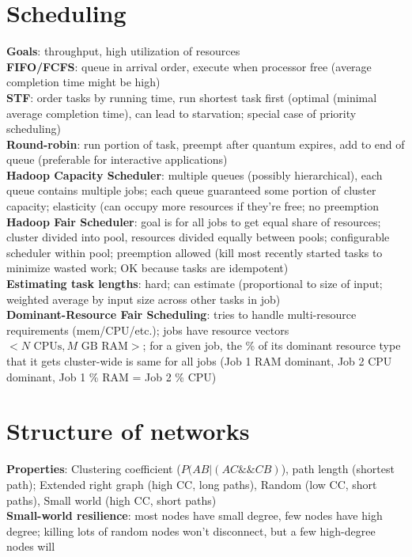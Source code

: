 \documentclass{article}
\begin{document}
\begin{multicols*}{3}
\section{Scheduling}
\textbf{Goals}: throughput, high utilization of resources \\
\textbf{FIFO/FCFS}: queue in arrival order, execute when processor free (average completion time might be high) \\
\textbf{STF}: order tasks by running time, run shortest task first (optimal (minimal average completion time), can lead to starvation; special case of priority scheduling) \\
\textbf{Round-robin}: run portion of task, preempt after quantum expires, add to end of queue (preferable for interactive applications) \\
\textbf{Hadoop Capacity Scheduler}: multiple queues (possibly hierarchical), each queue contains multiple jobs; each queue guaranteed some portion of cluster capacity; elasticity (can occupy more resources if they're free; no preemption \\
\textbf{Hadoop Fair Scheduler}: goal is for all jobs to get equal share of resources; cluster divided into pool, resources divided equally between pools; configurable scheduler within pool; preemption allowed (kill most recently started tasks to minimize wasted work; OK because tasks are idempotent) \\
\textbf{Estimating task lengths}: hard; can estimate (proportional to size of input; weighted average by input size across other tasks in job) \\
\textbf{Dominant-Resource Fair Scheduling}: tries to handle multi-resource requirements (mem/CPU/etc.); jobs have resource vectors $<N \text{ CPUs}, M \text{ GB RAM}>$; for a given job, the \% of its dominant resource type that it gets cluster-wide is same for all jobs (Job 1 RAM dominant, Job 2 CPU dominant, Job 1 \% RAM = Job 2 \% CPU)

\section{Structure of networks}
\textbf{Properties}: Clustering coefficient ($P(AB | (AC \&\& CB)$), path length (shortest path); Extended right graph (high CC, long paths), Random (low CC, short paths), Small world (high CC, short paths) \\
\textbf{Small-world resilience}: most nodes have small degree, few nodes have high degree; killing lots of random nodes won't disconnect, but a few high-degree nodes will


\end{multicols*}
\end{document}
